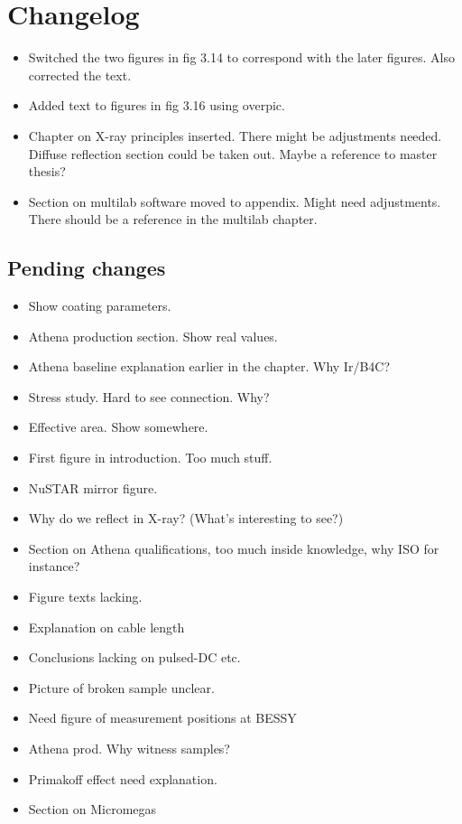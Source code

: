 \chapter{Changelog}

\begin{itemize}
  \item Switched the two figures in fig 3.14 to correspond with the later figures. Also corrected the text.
  \item Added text to figures in fig 3.16 using overpic.
  \item Chapter on X-ray principles inserted. There might be adjustments needed. Diffuse reflection section could be taken out. Maybe a reference to master thesis?
  \item Section on multilab software moved to appendix. Might need adjustments. There should be a reference in the multilab chapter. 
\end{itemize}

\section{Pending changes}

\begin{itemize}
	\item Show coating parameters.
	\item Athena production section. Show real values.
	\item Athena baseline explanation earlier in the chapter. Why Ir/B4C?
	\item Stress study. Hard to see connection. Why?
	\item Effective area. Show somewhere.
	\item First figure in introduction. Too much stuff.
	\item NuSTAR mirror figure.
	\item Why do we reflect in X-ray? (What's interesting to see?)
	\item Section on Athena qualifications, too much inside knowledge, why ISO for instance?
	\item Figure texts lacking.
	\item Explanation on cable length
	\item Conclusions lacking on pulsed-DC etc.
	\item Picture of broken sample unclear.
	\item Need figure of measurement positions at BESSY
	\item Athena prod. Why witness samples?
	\item Primakoff effect need explanation.
	\item Section on Micromegas

\end{itemize}
